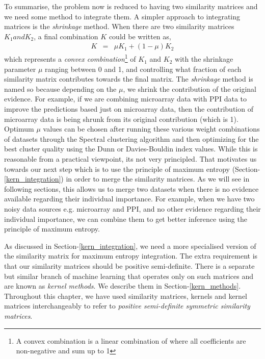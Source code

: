 To summarise, the problem now is reduced to having two similarity matrices and we need some method to integrate them. A simpler approach to integrating matrices is the \textit{shrinkage} method. When there are two similarity matrices $K_{1} and K_{2}$, a final combination $K$ could be written as,
\begin{eqnarray}
K &=& \mu K_{1}+(1-\mu)K_{2}
\end{eqnarray}
which represents a \textit{convex combination}\footnote{A convex combination is a linear combination of where all coefficients are non-negative and sum up to 1} of $K_{1}$ and $K_{2}$ with the shrinkage parameter $\mu$ ranging between 0 and 1, and controlling what fraction of each similarity matrix contributes towards the final matrix. The \textit{shrinkage} method is named so because depending on the $\mu$, we shrink the contribution of the original evidence. For example, if we are combining microarray data with \ac{PPI} data to improve the predictions based just on microarray data, then the contribution of microarray data is being shrunk from its original contribution (which is 1). Optimum $\mu$ values can be chosen after running these various weight combinations of datasets through the Spectral clustering algorithm and then optimizing for the best cluster quality using the Dunn or Davies-Bouldin index values. While this is reasonable from a practical viewpoint, its not very principled. That motivates us towards our next step which is to use the principle of maximum entropy (Section-\ref{kern_integration}) in order to merge the similarity matrices. As we will see in following sections, this allows us to merge two datasets when there is no evidence available regarding their individual importance. For example, when we have two noisy data sources e.g. microarray and \ac{PPI}, and no other evidence regarding their individual importance, we can combine them to get better inference using the principle of maximum entropy.

As discussed in Section-\ref{kern_integration}, we need a more specialised version of the similarity matrix for maximum entropy integration. The extra requirement is that our similarity matrices should be positive semi-definite. There is a separate but similar branch of machine learning that operates only on such matrices and are known as \textit{kernel methods}. We describe them in Section-\ref{kern_methods}. Throughout this chapter, we have used similarity matrices, kernels and kernel matrices interchangeably to refer to \textit{positive semi-definite symmetric similarity matrices}.

